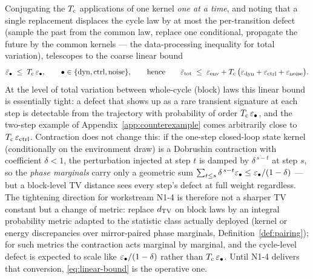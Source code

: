 \begin{remark}
\label{rem:linear}
Conjugating the $T_{\mathrm{c}}$ applications of one kernel \emph{one at a time}, and
noting that a single replacement displaces the cycle law by at most the
per-transition defect (sample the past from the common law, replace one
conditional, propagate the future by the common kernels --- the
data-processing inequality for total variation), telescopes to the coarse
linear bound
\begin{equation}
  \label{eq:linear-bound}
  \bar\varepsilon_{\mathrm{\bullet}} \;\le\; T_{\mathrm{c}}\, \varepsilon_{\mathrm{\bullet}},
  \qquad \bullet \in \{\mathrm{dyn}, \mathrm{ctrl}, \mathrm{noise}\},
  \qquad\text{hence}\qquad
  \bar\varepsilon_{\mathrm{tot}} \;\le\; \varepsilon_{\mathrm{env}} + T_{\mathrm{c}}\,\bigl(\varepsilon_{\mathrm{dyn}} + \varepsilon_{\mathrm{ctrl}} + \varepsilon_{\mathrm{noise}}\bigr).
\end{equation}
At the level of total variation between whole-cycle (block) laws this
linear bound is essentially tight: a defect that shows up as a rare transient
signature at each step is detectable from the trajectory with probability of
order $T_{\mathrm{c}}\,\varepsilon_{\mathrm{\bullet}}$, and the two-step example of
Appendix~\ref{app:counterexample} comes arbitrarily close to
$T_{\mathrm{c}}\,\varepsilon_{\mathrm{ctrl}}$. Contraction does not change this: if the one-step
closed-loop state kernel (conditionally on the environment draw) is a
Dobrushin contraction with coefficient $\delta<1$, the perturbation injected
at step $t$ is damped by $\delta^{\,s-t}$ at step $s$, so the \emph{phase
marginals} carry only a geometric sum $\sum_{t\le s}\delta^{\,s-t}\varepsilon_{\mathrm{\bullet}}
\le \varepsilon_{\mathrm{\bullet}}/(1-\delta)$ --- but a block-level TV distance sees every
step's defect at full weight regardless. The tightening direction for
workstream N1-4 is therefore not a sharper TV constant but a change of
metric: replace $d_{\mathrm{TV}}$ on block laws by an integral probability metric
adapted to the statistic class actually deployed (kernel or energy
discrepancies over mirror-paired phase marginals, Definition~\ref{def:pairing});
for such metrics the contraction acts marginal by marginal, and the
cycle-level defect is expected to scale like $\varepsilon_{\mathrm{\bullet}}/(1-\delta)$ rather
than $T_{\mathrm{c}}\,\varepsilon_{\mathrm{\bullet}}$.
Until N1-4 delivers that conversion, \eqref{eq:linear-bound} is the operative
one.
\end{remark}

